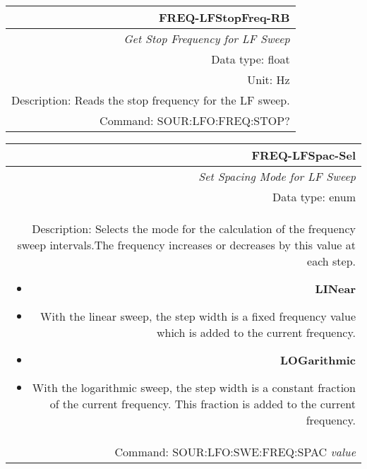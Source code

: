 \documentclass[openany]{article}
\begin{document}
		\begin{tabular}{N}
			\hline
			\bfseries FREQ-LFStopFreq-RB \\ \hline
			\emph{Get Stop Frequency for LF Sweep} \\
			Data type: float \\
			Unit: Hz \\
			Description: Reads the stop frequency for the LF sweep. \\
			Command: SOUR:LFO:FREQ:STOP? \\

		\end{tabular}
%
		\begin{tabular}{N}
			\hline
			\bfseries FREQ-LFSpac-Sel \\ \hline
			\emph{Set Spacing Mode for LF Sweep} \\
			Data type: enum \\ 
			Description: Selects the mode for the calculation of the frequency sweep intervals.The frequency increases or decreases by this value at each step.\begin{itemize}[noitemsep]
				\small
				\item[] \textbf{LINear} 
				\item[] With the linear sweep, the step width is a fixed frequency value which is added to the current frequency.
				\item[] \textbf{LOGarithmic}
				\item[] With the logarithmic sweep, the step width is a constant fraction of the current frequency. This fraction is added to the current frequency.
			\end{itemize} \\
			Command: SOUR:LFO:SWE:FREQ:SPAC \emph{value} \\

		\end{tabular}
\end{document}
